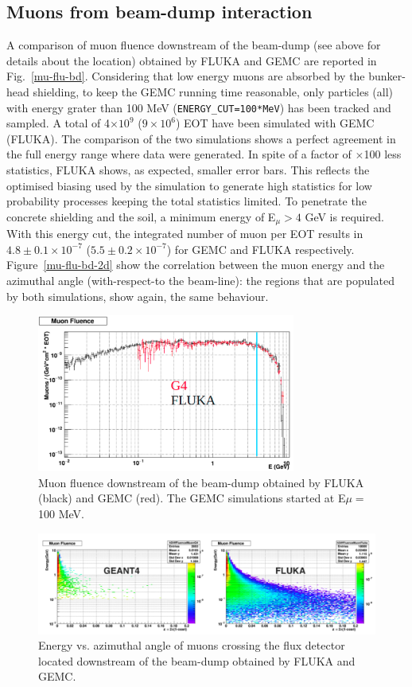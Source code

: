 \subsection{Muons from beam-dump interaction}
A comparison of muon fluence downstream of the beam-dump (see above for details about the location)
obtained by FLUKA and GEMC are reported in Fig.~\ref{mu-flu-bd}. Considering that low energy muons are absorbed by the bunker-head shielding, to keep the GEMC running time reasonable, only particles (all) with energy grater than 100 MeV ({\tt ENERGY\_CUT=100*MeV}) has been tracked and sampled. A total of 4$\times10^9$ ($9\times 10^6$) EOT have been simulated with GEMC (FLUKA). The comparison of the two simulations shows a perfect agreement in the full energy range where data were generated.
In spite of a factor of $\times$100  less statistics, FLUKA shows, as expected, smaller error bars. This reflects the optimised biasing used by the simulation to generate high statistics for low probability processes keeping the total statistics limited.
To penetrate  the concrete shielding and the soil, a minimum energy of  E$_\mu>4$ GeV is required. With this energy cut,   the integrated number of muon per EOT results in $4.8\pm 0.1 \times 10^{-7}$ ($5.5\pm 0.2 \times 10^{-7}$) for GEMC and FLUKA respectively.
Figure~\ref{mu-flu-bd-2d} show the correlation between the muon energy and the azimuthal angle (with-respect-to the beam-line): the regions that are populated by both simulations, show again, the same behaviour.

\begin{figure}[h!] 
\center
\includegraphics[width=8.5cm]{figs/mu-flu-bd.pdf}
\caption{Muon fluence downstream of the beam-dump obtained by FLUKA (black) and GEMC (red). The GEMC simulations started at E$\mu=$100 MeV.}
\label{fig:mu-flu-bd}
\end{figure}

\begin{figure}[h!] 
\center
\includegraphics[width=16cm]{figs/mu-flu-bd-2d.pdf} 
\caption{Energy vs. azimuthal angle of muons crossing the flux detector located downstream of the beam-dump obtained by FLUKA  and GEMC.}
\label{fig:mu-flu-bd-2d}
\end{figure}


